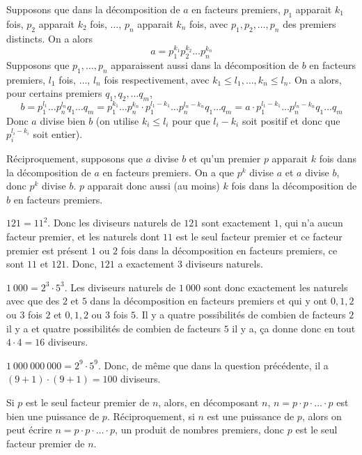 \begin{sol}
Supposons que dans la décomposition de $a$ en facteurs premiers, $p_1$ apparait $k_1$ fois, $p_2$ apparait $k_2$ fois, $\dots$, $p_n$ apparait $k_n$ fois, avec $p_1, p_2, \dots, p_n$ des premiers distincts. On a alors
$$a = p_1^{k_1} p_2^{k_2} \dots p_n^{k_n}$$
Supposons que $p_1, \dots, p_n$ apparaissent aussi dans la décomposition de $b$ en facteurs premiers, $l_1$ fois, $\dots$, $l_n$ fois respectivement, avec $k_1 \le l_1, \dots, k_n \le l_n$. On a alors, pour certains premiers $q_1, q_2, \dots q_m$,
$$b = p_1^{l_1} \dots p_n^{l_n} q_1 \dots q_m = p_1^{k_1} \dots p_n^{k_n} \cdot p_1^{l_1 - k_1} \dots p_n^{l_n - k_n} q_1 \dots q_m = a \cdot p_1^{l_1 - k_1} \dots p_n^{l_n - k_n} q_1 \dots q_m$$
Donc $a$ divise bien $b$ (on utilise $k_i \le l_i$ pour que $l_i - k_i$ soit positif et donc que $p_i^{l_i - k_i}$ soit entier).

Réciproquement, supposons que $a$ divise $b$ et qu'un premier $p$ apparait $k$ fois dans la décomposition de $a$ en facteurs premiers. On a que $p^k$ divise $a$ et $a$ divise $b$, donc $p^k$ divise $b$. $p$ apparait donc aussi (au moins) $k$ fois dans la décomposition de $b$ en facteurs premiers.
\end{sol}


\begin{sol}
$121 = 11^2$. Donc les diviseurs naturels de $121$ sont exactement $1$, qui n'a aucun facteur premier, et les naturels dont $11$ est le seul facteur premier et ce facteur premier est présent $1$ ou $2$ fois dans la décomposition en facteurs premiers, ce sont $11$ et $121$. Donc, $121$ a exactement $3$ diviseurs naturels.

$1\ 000 = 2^3 \cdot 5^3$. Les diviseurs naturels de $1\ 000$ sont donc exactement les naturels avec que des $2$ et $5$ dans la décomposition en facteurs premiers et qui y ont $0, 1, 2$ ou $3$ fois $2$ et $0, 1, 2$ ou $3$ fois $5$. Il y a quatre possibilités de combien de facteurs $2$ il y a et quatre possibilités de combien de facteurs $5$ il y a, ça donne donc en tout $4 \cdot 4 = 16$ diviseurs.

$1\ 000\ 000\ 000 = 2^9 \cdot 5^9$. Donc, de même que dans la question précédente, il a $(9 + 1)\cdot (9 + 1) = 100$ diviseurs.
\end{sol}


\begin{sol}
Si $p$ est le seul facteur premier de $n$, alors, en décomposant $n$, $n = p \cdot p \cdot \dots \cdot p$ est bien une puissance de $p$. Réciproquement, si $n$ est une puissance de $p$, alors on peut écrire $n = p \cdot p \cdot \dots \cdot p$, un produit de nombres premiers, donc $p$ est le seul facteur premier de $n$.
\end{sol}


